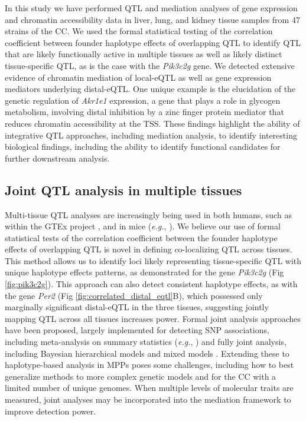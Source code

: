 \documentclass[10pt,letterpaper]{article}
\newcommand{\eg}{\emph{e.g.}\xspace}
\begin{document}
In this study we have performed QTL and mediation analyses of gene expression and chromatin accessibility data in liver, lung, and kidney tissue samples from 47 strains of the CC. We used the formal statistical testing of the correlation coefficient between founder haplotype effects of overlapping QTL to identify QTL that are likely functionally active in multiple tissues as well as likely distinct tissue-specific QTL, as is the case with the \textit{Pik3c2g} gene. We detected extensive evidence of chromatin mediation of local-eQTL as well as gene expression mediators underlying distal-eQTL. One unique example is the elucidation of the genetic regulation of \textit{Akr1e1} expression, a gene that plays a role in glycogen metabolism, involving distal inhibition by a zinc finger protein mediator that reduces chromatin accessibility at the TSS. These findings highlight the ability of integrative QTL approaches, including mediation analysis, to identify interesting biological findings, including the ability to identify functional candidates for further downstream analysis.

\subsection*{Joint QTL analysis in multiple tissues}

Multi-tissue QTL analyses are increasingly being used in both humans, such as within the GTEx project \cite{GTEX2017}, 
and in mice (\eg, \cite{Huang2009}).
We believe our use of formal statistical tests of the correlation coefficient between the founder haplotype effects of overlapping QTL is novel in defining co-localizing QTL across tissues. This method allows us to identify loci likely representing tissue-specific QTL with unique haplotype effects patterns, as demonstrated for the gene \textit{Pik3c2g} (Fig \ref{fig:pik3c2g}).
This approach can also detect consistent haplotype effects, as with the gene \textit{Per2} (Fig \ref{fig:correlated_distal_eqtl}B), which possessed only marginally significant distal-eQTL in the three tissues, suggesting jointly mapping QTL across all tissues increases power. Formal joint analysis approaches have been proposed, largely implemented for detecting SNP associations, including meta-analysis on summary statistics (\eg, \cite{Fu2012a, Sul2013}) and fully joint analysis, including Bayesian hierarchical models \cite{Flutre2013} and mixed models \cite{Acharya2016}. Extending these to haplotype-based analysis in MPPs poses some challenges, including how to best generalize methods to more complex genetic models and for the CC with a limited number of unique genomes. 
When multiple levels of molecular traits are measured, joint analyses may be incorporated into the mediation framework to improve detection power.
\end{document}
